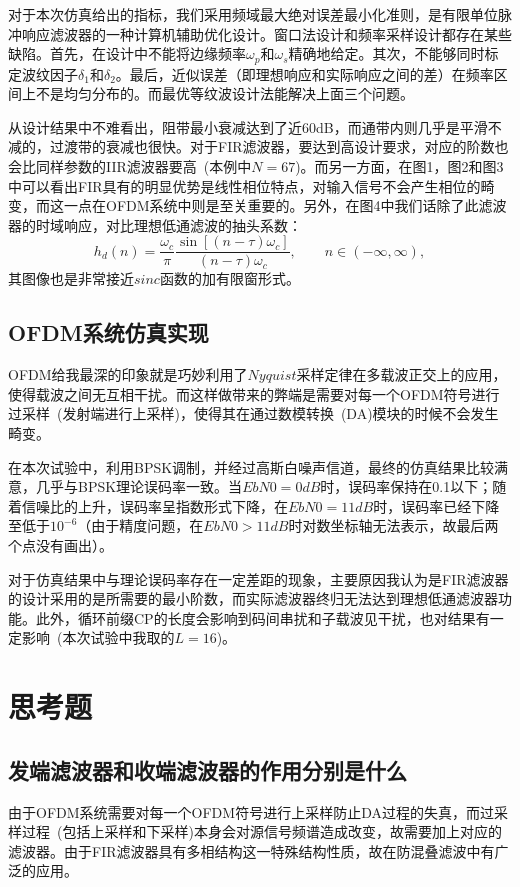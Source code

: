 \documentclass[a4paper,11pt,onecolumn,twoside]{article}
\begin{document}
对于本次仿真给出的指标，我们采用频域最大绝对误差最小化准则，是有限单位脉冲响应滤波器的一种计算机辅助优化设计。窗口法设计和频率采样设计都存在某些缺陷。首先，在设计中不能将边缘频率$\omega_p$和$\omega_s$精确地给定。其次，不能够同时标定波纹因子$\delta_1$和$\delta_2$。最后，近似误差（即理想响应和实际响应之间的差）在频率区间上不是均匀分布的。而最优等纹波设计法能解决上面三个问题。

从设计结果中不难看出，阻带最小衰减达到了近60dB，而通带内则几乎是平滑不减的，过渡带的衰减也很快。对于FIR滤波器，要达到高设计要求，对应的阶数也会比同样参数的IIR滤波器要高~(本例中$N=67$)。而另一方面，在图1，图2和图3中可以看出FIR具有的明显优势是线性相位特点，对输入信号不会产生相位的畸变，而这一点在OFDM系统中则是至关重要的。另外，在图4中我们话除了此滤波器的时域响应，对比理想低通滤波的抽头系数：
\vspace{0.2cm}
\begin{equation}
h_d(n) = \frac{\omega_c}{\pi} \frac{\sin [ (n- \tau ) \omega_c ]}{(n- \tau ) \omega_c }, \qquad n \in (- \infty , \infty),
\end{equation}
其图像也是非常接近$sinc$函数的加有限窗形式。

\subsection{OFDM系统仿真实现}
OFDM给我最深的印象就是巧妙利用了$Nyquist$采样定律在多载波正交上的应用，使得载波之间无互相干扰。而这样做带来的弊端是需要对每一个OFDM符号进行过采样~(发射端进行上采样)，使得其在通过数模转换~(DA)模块的时候不会发生畸变。

在本次试验中，利用BPSK调制，并经过高斯白噪声信道，最终的仿真结果比较满意，几乎与BPSK理论误码率一致。当$EbN0 = 0dB$时，误码率保持在0.1以下；随着信噪比的上升，误码率呈指数形式下降，在$EbN0 = 11dB$时，误码率已经下降至低于$10^{-6}$（由于精度问题，在$EbN0 > 11dB$时对数坐标轴无法表示，故最后两个点没有画出）。

对于仿真结果中与理论误码率存在一定差距的现象，主要原因我认为是FIR滤波器的设计采用的是所需要的最小阶数，而实际滤波器终归无法达到理想低通滤波器功能。此外，循环前缀CP的长度会影响到码间串扰和子载波见干扰，也对结果有一定影响~(本次试验中我取的$L=16$)。


\section{思考题}

\subsection{发端滤波器和收端滤波器的作用分别是什么}
由于OFDM系统需要对每一个OFDM符号进行上采样防止DA过程的失真，而过采样过程~(包括上采样和下采样)本身会对源信号频谱造成改变，故需要加上对应的滤波器。由于FIR滤波器具有多相结构这一特殊结构性质，故在防混叠滤波中有广泛的应用。
\end{document}
